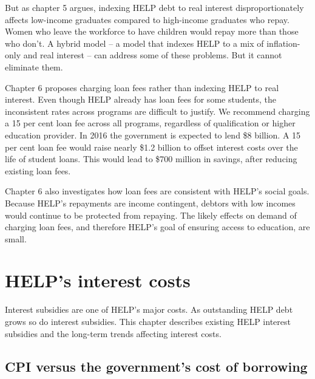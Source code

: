 \documentclass[]{book}
\begin{document}
But as chapter 5 argues, indexing HELP debt to real interest disproportionately affects low-income graduates compared to high-income graduates who repay. Women who leave the workforce to have children would repay more than those who don't. A hybrid model -- a model that indexes HELP to a mix of inflation-only and real interest -- can address some of these problems. But it cannot eliminate them.

Chapter 6 proposes charging loan fees rather than indexing HELP to real interest. Even though HELP already has loan fees for some students, the inconsistent rates across programs are difficult to justify. We recommend charging a 15 per cent loan fee across all programs, regardless of qualification or higher education provider. In 2016 the government is expected to lend \$8 billion. A 15 per cent loan fee would raise nearly \$1.2 billion to offset interest costs over the life of student loans. This would lead to \$700 million in savings, after reducing existing loan fees.

Chapter 6 also investigates how loan fees are consistent with HELP's social goals. Because HELP's repayments are income contingent, debtors with low incomes would continue to be protected from repaying. The likely effects on demand of charging loan fees, and therefore HELP's goal of ensuring access to education, are small.

\chapter{}\label{section}

\chapter{\texorpdfstring{\protect\hypertarget{_Ref333151488}{}{\protect\hypertarget{_Ref333151510}{}{\protect\hypertarget{_Toc341784481}{}{\protect\hypertarget{_Ref309722967}{}{}}}}HELP's interest costs}{HELP's interest costs}}\label{helps-interest-costs}

Interest subsidies are one of HELP's major costs. As outstanding HELP debt grows so do interest subsidies. This chapter describes existing HELP interest subsidies and the long-term trends affecting interest costs.

\section{CPI versus the government's cost of borrowing}\label{cpi-versus-the-governments-cost-of-borrowing}
\end{document}
